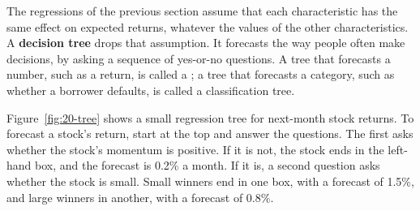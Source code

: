 The regressions of the previous section assume that each characteristic has the same effect on expected returns, whatever the values of the other characteristics. A \textbf{decision tree} drops that assumption. It forecasts the way people often make decisions, by asking a sequence of yes-or-no questions. A tree that forecasts a number, such as a return, is called a ; a tree that forecasts a category, such as whether a borrower defaults, is called a classification tree.

Figure~\ref{fig:20-tree} shows a small regression tree for next-month stock returns. To forecast a stock's return, start at the top and answer the questions. The first asks whether the stock's momentum is positive. If it is not, the stock ends in the left-hand box, and the forecast is 0.2\% a month. If it is, a second question asks whether the stock is small. Small winners end in one box, with a forecast of 1.5\%, and large winners in another, with a forecast of 0.8\%.


